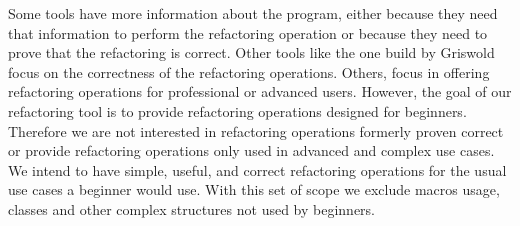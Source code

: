 Some tools have more information about the program, either because they need that
information to perform the refactoring operation or because they need to prove that
the refactoring is correct.  %
Other tools like the one build by Griswold focus on the correctness of the refactoring
operations.
Others, focus in offering refactoring operations for professional or advanced users.
However, the goal of our refactoring tool is to provide refactoring operations
designed for beginners. %
Therefore we are not interested in refactoring operations formerly proven %
correct or provide refactoring operations only used in advanced and complex use cases. %
We intend to have simple, useful, and correct refactoring operations for the usual use cases a beginner would use.
With this set of scope we exclude macros usage, classes and other complex structures %
not used by beginners.

